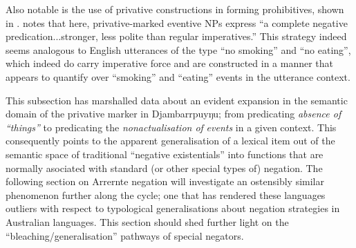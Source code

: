 \documentclass[output=paper,draft,draftmode,colorlinks,citecolor=brown]{langscibook}
\begin{document}
\hspace*{-4pt}Also notable is the use of privative constructions in forming prohibitives,
shown in . \citet[446]{Wilkinson1991} notes that here, privative-marked eventive NPs express ``a complete negative predication...stronger, less polite than regular imperatives.'' This strategy indeed seems analogous to English utterances of the type ``no smoking'' and ``no eating'', which indeed do carry imperative force and are constructed in a manner that appears to quantify over ``smoking'' and ``eating'' events in the utterance context.

This subsection has marshalled data about an evident expansion in the
semantic domain of the privative marker in Djambarrpuyŋu; from
predicating\textit{ absence of ``things''} to predicating the
\textit{nonactualisation of }\textit{events} in a given context. This
consequently points to the apparent generalisation of a lexical item out of
the semantic space of traditional ``negative existentials'' into functions
that are normally asociated with standard (or other special types of)
negation. The following section on Arrernte negation will investigate an
ostensibly similar phenomenon further along the cycle; one that has
rendered these languages outliers with respect to typological
generalisations about negation strategies in Australian languages. This
section should shed further light on the ``bleaching\slash generalisation''
pathways of special negators.
\end{document}
